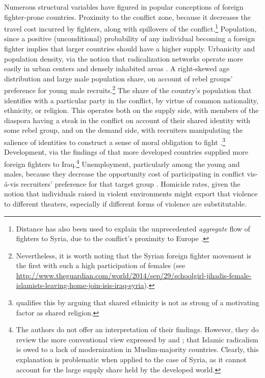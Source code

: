 \documentclass[12pt]{article}
\begin{document}
Numerous structural variables have figured in popular conceptions of foreign fighter-prone countries. Proximity to the conflict zone, because it decreases the travel cost incurred by fighters, along with spillovers of the conflict.\footnote{Distance has also been used to explain the unprecedented \textit{aggregate} flow of fighters to Syria, due to the conflict's proximity to Europe \citep{Hegghammer2011}.} Population, since a positive (unconditional) probability of any individual becoming a foreign fighter implies that larger countries should have a higher supply. Urbanicity and population density, via the notion that radicalization networks operate more easily in urban centers and densely inhabited areas \citep{Gibbs1989}. A right-skewed age distribution and large male population share, on account of rebel groups' preference for young male recruits.\footnote{Nevertheless, it is worth noting that the Syrian foreign fighter movement is the first with such a high participation of females (see \href{http://www.theguardian.com/world/2014/sep/29/schoolgirl-jihadis-female-islamists-leaving-home-join-isis-iraq-syria}{http://www.theguardian.com/world/2014/sep/29/schoolgirl-jihadis-female-islamists-leaving-home-join-isis-iraq-syria}).} The share of the country's population that identifies with a particular party in the conflict, by virtue of common nationality, ethnicity, or religion. This operates both on the supply side, with members of the diaspora having a steak in the conflict on account of their shared identity with some rebel group, and on the demand side, with recruiters manipulating the salience of identities to construct a sense of moral obligation to fight \citep{Malet2010}.\footnote{\cite{Malet2015} qualifies this by arguing that shared ethnicity is not as strong of a motivating factor as shared religion.} Development, via the findings of \cite{Hewitt2009} that more developed countries supplied more foreign fighters to Iraq.\footnote{The authors do not offer an interpretation of their findings. However, they do review the more conventional view expressed by \cite{Lewis2004} and \cite{Gerges2009}; that Islamic radicalism is owed to a lack of modernization in Muslim-majority countries. Clearly, this explanation is problematic when applied to the case of Syria, as it cannot account for the large supply share held by the developed world.} Unemployment, particularly among the young and males, because they decrease the opportunity cost of participating in conflict vis-\'a-vis recruiters' preference for that target group \citep{RAN2014}. Homicide rates, given the notion that individuals raised in violent environments might export that violence to different theaters, especially if different forms of violence are substitutable.	\\
\end{document}
